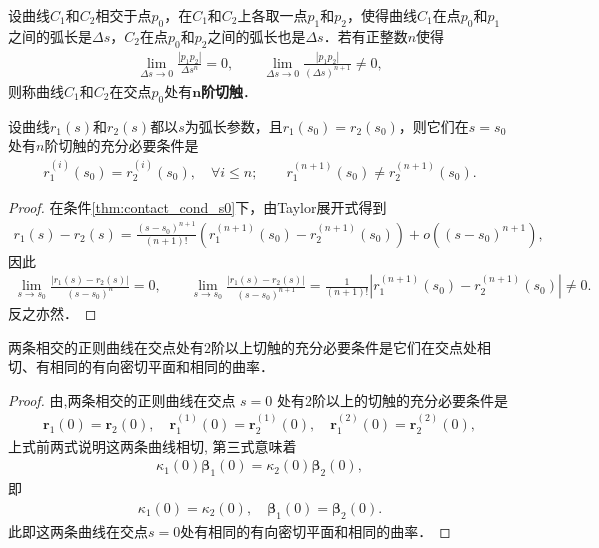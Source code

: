\documentclass[../../main.tex]{subfiles}%
\begin{document}
\begin{definition}[切触]
设曲线$C_1$和$C_2$相交于点$p_0$，在$C_1$和$C_2$上各取一点$p_1$和$p_2$，使得曲线$C_1$在点$p_0$和$p_1$之间的弧长是$\Delta s$，$C_2$在点$p_0$和$p_2$之间的弧长也是$\Delta s$．若有正整数$n$使得
\begin{align*}
\lim_{\Delta s \to 0} \frac{|p_1p_2|}{\Delta s^n} = 0,\qquad 
\lim_{\Delta s \to 0} \frac{|p_1p_2|}{(\Delta s)^{n+1}} \neq 0,
\end{align*}
则称曲线$C_1$和$C_2$在交点$p_0$处有$\bm{n}$\textbf{阶切触}．
\end{definition}

\begin{theorem}\label{theorem:微分几何-定理6.1}
设曲线$r_1(s)$和$r_2(s)$都以$s$为弧长参数，且$r_1(s_0)=r_2(s_0)$，则它们在$s=s_0$处有$n$阶切触的充分必要条件是
\begin{align}
r_1^{(i)}(s_0) = r_2^{(i)}(s_0),\quad \forall i \leqslant n;\qquad 
r_1^{(n+1)}(s_0) \neq r_2^{(n+1)}(s_0). \label{thm:contact_cond_s0}
\end{align}
\end{theorem}
\begin{proof}
在条件\eqref{thm:contact_cond_s0}下，由Taylor展开式得到
\begin{align*}
r_1(s)-r_2(s)=\frac{(s-s_0)^{n+1}}{(n+1)!}\left(r_1^{(n+1)}(s_0)-r_2^{(n+1)}(s_0)\right)+o\left((s-s_0)^{n+1}\right),
\end{align*}
因此
\begin{align*}
\lim_{s \to s_0} \frac{|r_1(s)-r_2(s)|}{(s-s_0)^n}=0,\qquad 
\lim_{s \to s_0} \frac{|r_1(s)-r_2(s)|}{(s-s_0)^{n+1}}=\frac{1}{(n+1)!}\left|r_1^{(n+1)}(s_0)-r_2^{(n+1)}(s_0)\right| \neq 0.
\end{align*}
反之亦然．
\end{proof}

\begin{corollary}
两条相交的正则曲线在交点处有$2$阶以上切触的充分必要条件是它们在交点处相切、有相同的有向密切平面和相同的曲率．
\end{corollary}
\begin{proof}
由,两条相交的正则曲线在交点 $s=0$ 处有2阶以上的切触的充分必要条件是
\begin{align*}
\bm{r}_1(0) = \bm{r}_2(0),\quad \bm{r}_1^{(1)}(0) = \bm{r}_2^{(1)}(0),\quad \bm{r}_1^{(2)}(0) = \bm{r}_2^{(2)}(0),
\end{align*}
上式前两式说明这两条曲线相切, 第三式意味着
\begin{align*}
\kappa_1(0)\bm{\beta}_1(0) = \kappa_2(0)\bm{\beta}_2(0),
\end{align*}
即
\begin{align*}
\kappa_1(0) = \kappa_2(0),\quad \bm{\beta}_1(0) = \bm{\beta}_2(0).
\end{align*}
此即这两条曲线在交点$s=0$处有相同的有向密切平面和相同的曲率．
\end{proof}
\end{document}
